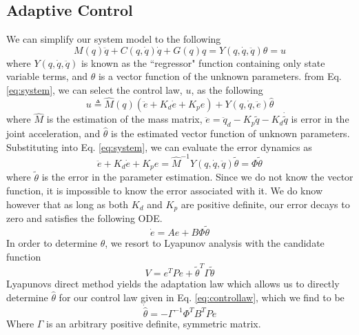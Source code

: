 \subsection*{Adaptive Control}
We can simplify our system model to the following
\begin{equation}
	M(q)\ddot{q} + C(q,\dot{q})\dot{q} + G(q)q = Y(q,\dot{q},\ddot{q})\theta = u
	\label{eq:system}
\end{equation}
where $Y(q,\dot{q},\ddot{q})$ is known as the ``regressor" function containing only state variable terms, and $\theta$ is a vector function of the unknown parameters. from Eq. \eqref{eq:system}, we can select the control law, $u$, as the following
\begin{equation}
	u \triangleq \hat{M}(q)(\ddot{e} + K_{d}\dot{e} + K_{p}e) + Y(q,\dot{q},\ddot{e})\hat{\theta}
	\label{eq:controllaw}
\end{equation}
where $\hat{M}$ is the estimation of the mass matrix, $\ddot{e}=\ddot{q}_{d} - K_{p}\tilde{q} - K_{d}\dot{\tilde{q}}$ is error in the joint acceleration, and $\hat{\theta}$ is the estimated vector function of unknown parameters. Substituting into Eq. \eqref{eq:system}, we can evaluate the error dynamics as
\begin{equation}
	\ddot{e} + K_{d}\dot{e} + K_{p}e = \hat{M}^{-1}Y(q,\dot{q},\ddot{q})\tilde{\theta} = \Phi\tilde{\theta}
\end{equation}
where $\tilde{\theta}$ is the error in the parameter estimation. Since we do not know the vector function, it is impossible to know the error associated with it. We do know however that as long as both $K_{d}$ and $K_{p}$ are positive definite, our error decays to zero and satisfies the following ODE.
\begin{equation}
	\dot{e} = Ae + B\Phi\tilde{\theta}
\end{equation}
In order to determine $\theta$, we resort to Lyapunov analysis with the candidate function
\begin{equation}
	V = e^{T}Pe + \tilde{\theta}^{T}\Gamma\tilde{\theta}
\end{equation}
Lyapunovs direct method yields the adaptation law which allows us to directly determine $\hat{\theta}$ for our control law given in Eq. \eqref{eq:controllaw}, which we find to be
\begin{equation}
	\dot{\hat{\theta}} = -\Gamma^{-1}\Phi^{T}B^{T}Pe
	\label{eq:adaptLaw}
\end{equation}
Where $\Gamma$ is an arbitrary positive definite, symmetric matrix.
